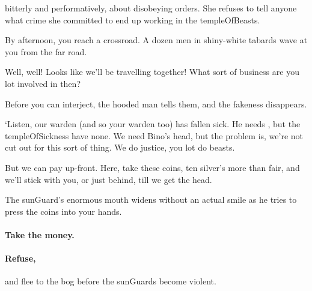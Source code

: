 bitterly and performatively, about disobeying orders.
She refuses to tell anyone what crime she committed to end up working in the \gls{templeOfBeasts}.

By afternoon, you reach a crossroad.
A dozen men in shiny-white tabards wave at you from the far road.

\begin{speechtext}
  Well, well!
  Looks like we'll be travelling together!
  What sort of business are you lot involved in then?
\end{speechtext}

Before you can interject, the hooded man tells them, and the fakeness disappears.

\begin{speechtext}
  `Listen, our \gls{warden} (and so your \gls{warden} too) has fallen sick.
  He needs , but the \gls{templeOfSickness} have none.
  We need Bino's head, but the problem is, we're not cut out for this sort of thing.
  We do justice, you lot do beasts.

  But we can pay up-front.
  Here, take these coins, ten silver's more than fair, and we'll stick with you, or just behind, till we get the head.
\end{speechtext}

The \gls{sunGuard}'s enormous mouth widens without an actual smile as he tries to press the coins into your hands.

\paragraph{Take the money.}

\paragraph{Refuse,}
and flee to the bog before the \glspl{sunGuard} become violent.
